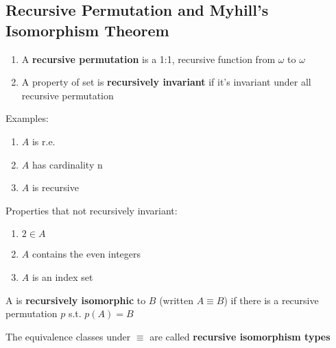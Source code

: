 \documentclass[11pt]{article}
\begin{document}
\subsection{Recursive Permutation and Myhill's Isomorphism Theorem}
\label{sec:org72462dd}
\begin{definition}[]
\begin{enumerate}
\item A \textbf{recursive permutation} is a 1:1, recursive function from \(\omega\) to \(\omega\)
\item A property of set is \textbf{recursively invariant} if it's invariant under all
recursive permutation
\end{enumerate}
\end{definition}
Examples:
\begin{enumerate}
\item \(A\) is r.e.
\item \(A\) has cardinality n
\item \(A\) is recursive
\end{enumerate}


Properties that not recursively invariant:
\begin{enumerate}
\item \(2\in A\)
\item \(A\) contains the even integers
\item \(A\) is an index set
\end{enumerate}


\begin{definition}[]
A is \textbf{recursively isomorphic} to \(B\) (written \(A\equiv B\)) if there is a
recursive permutation \(p\) s.t. \(p(A)=B\)
\end{definition}

\begin{definition}[]
The equivalence classes under \(\equiv\) are called \textbf{recursive isomorphism types}
\end{definition}
\end{document}
